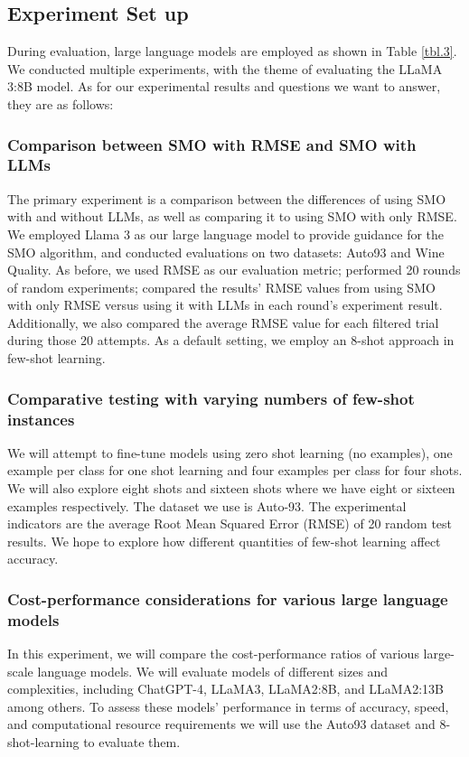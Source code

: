 \documentclass{ieeeaccess}
\begin{document}
\subsection{Experiment Set up}

During evaluation, large language models are employed as shown in Table \ref{tbl.3}. We conducted multiple experiments, with the theme of evaluating the LLaMA 3:8B model. As for our experimental results and questions we want to answer, they are as follows:

\subsubsection{Comparison between SMO with RMSE and SMO with LLMs}
The primary experiment is a comparison between the differences of using SMO with and without LLMs, as well as comparing it to using SMO with only RMSE. We employed Llama 3 as our large language model to provide guidance for the SMO algorithm, and conducted evaluations on two datasets: Auto93 and Wine Quality. As before, we used RMSE as our evaluation metric; performed 20 rounds of random experiments; compared the results' RMSE values from using SMO with only RMSE versus using it with LLMs in each round's experiment result. Additionally, we also compared the average RMSE value for each filtered trial during those 20 attempts. As a default setting, we employ an 8-shot approach in few-shot learning.
\subsubsection{Comparative testing with varying numbers of few-shot instances}
We will attempt to fine-tune models using zero shot learning (no examples), one example per class for one shot learning and four examples per class for four shots. We will also explore eight shots and sixteen shots where we have eight or sixteen examples respectively. The dataset we use is Auto-93. The experimental indicators are the average Root Mean Squared Error (RMSE) of 20 random test results. We hope to explore how different quantities of few-shot learning affect accuracy.

\subsubsection{Cost-performance considerations for various large language models}

In this experiment, we will compare the cost-performance ratios of various large-scale language models. We will evaluate models of different sizes and complexities, including ChatGPT-4, LLaMA3, LLaMA2:8B, and LLaMA2:13B among others. To assess these models' performance in terms of accuracy, speed, and computational resource requirements we will use the Auto93 dataset and 8-shot-learning to evaluate them.
\end{document}
